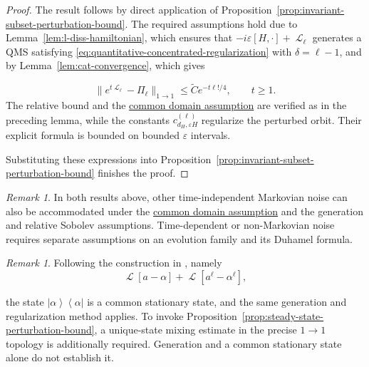 \documentclass[11pt]{article}
\theoremstyle{myplain}
\theoremstyle{mydefinition}
\theoremstyle{remark}
\newtheorem{rmk}[ex]{Remark}
\DeclareMathOperator{\cL}{\mathcal{L}}
\DeclareMathOperator{\1}{\mathds{1}}
\newcommand{\ketbra}[2]{\left\vert#1\right\rangle\!\! \left\langle#2\right\vert}
\begin{document}
        \begin{proof}
            The result follows by direct application of Proposition~\ref{prop:invariant-subset-perturbation-bound}. The required assumptions hold due to Lemma~\ref{lem:l-diss-hamiltonian}, which ensures that $-i\varepsilon[H,\cdot]+\cL_\ell$ generates a QMS satisfying \eqref{eq:quantitative-concentrated-regularization} with $\delta=\ell-1$, and by Lemma~\ref{lem:cat-convergence}, which gives
            
            \begin{equation*}
                \|e^{t\cL_\ell}-\Pi_\ell\|_{1\to1}
                \leq\widetilde C e^{-t\ell!/4},\qquad t\geq1.
            \end{equation*}
            The relative bound and the \hyperref[assum:perturbation-common-domain]{common domain assumption} are verified as in the preceding lemma, while the constants $c_{d_H,\varepsilon H}^{(\ell)}$ regularize the perturbed orbit. Their explicit formula is bounded on bounded $\varepsilon$ intervals.
            
            Substituting these expressions into Proposition~\ref{prop:invariant-subset-perturbation-bound} finishes the proof.
        \end{proof}

        \begin{rmk}
            In both results above, other time-independent Markovian noise can also be accommodated under the \hyperref[assum:perturbation-common-domain]{common domain assumption} and the generation and relative Sobolev assumptions. Time-dependent or non-Markovian noise requires separate assumptions on an evolution family and its Duhamel formula.
        \end{rmk}

        \begin{rmk}
            Following the construction in \cite{Moebus.2025}, namely
            \begin{equation*}
                \cL[a - \alpha] + \cL[a^\ell - \alpha^\ell],
            \end{equation*}
            
            the state $\ketbra\alpha\alpha$ is a common stationary state, and the same generation and regularization method applies. To invoke Proposition~\ref{prop:steady-state-perturbation-bound}, a unique-state mixing estimate in the precise $1\to1$ topology is additionally required. Generation and a common stationary state alone do not establish it.
            
        \end{rmk}
\end{document}
